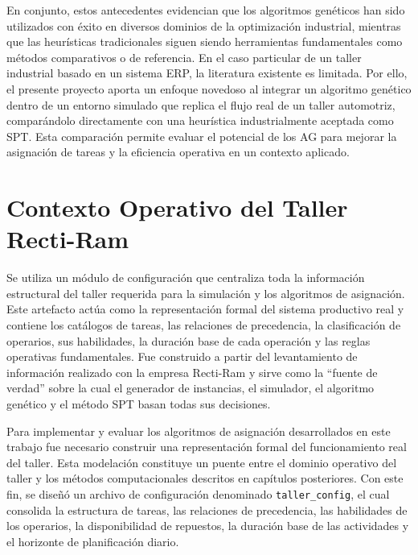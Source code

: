 En conjunto, estos antecedentes evidencian que los algoritmos genéticos han sido utilizados 
con éxito en diversos dominios de la optimización industrial, mientras que las heurísticas 
tradicionales siguen siendo herramientas fundamentales como métodos comparativos o de referencia. 
En el caso particular de un taller industrial basado en un sistema ERP, la literatura existente es 
limitada. Por ello, el presente proyecto aporta un enfoque novedoso al integrar un algoritmo genético 
dentro de un entorno simulado que replica el flujo real de un taller automotriz, 
comparándolo directamente con una heurística industrialmente aceptada como SPT. Esta comparación 
permite evaluar el potencial de los AG para mejorar la asignación de tareas y la eficiencia operativa 
en un contexto aplicado.

\section{Contexto Operativo del Taller Recti-Ram}

Se utiliza un módulo de configuración que centraliza toda la información estructural del taller 
requerida para la simulación y los algoritmos de asignación. Este artefacto actúa como la 
representación formal del sistema productivo real y contiene los catálogos de tareas, las 
relaciones de precedencia, la clasificación de operarios, sus habilidades, la duración base 
de cada operación y las reglas operativas fundamentales. Fue construido a partir del 
levantamiento de información realizado con la empresa Recti-Ram y sirve como la “fuente 
de verdad” sobre la cual el generador de instancias, el simulador, el algoritmo genético 
y el método SPT basan todas sus decisiones.

Para implementar y evaluar los algoritmos de asignación desarrollados en este trabajo 
fue necesario construir una representación formal del funcionamiento real del taller. 
Esta modelación constituye un puente entre el dominio operativo del taller y los métodos 
computacionales descritos en capítulos posteriores. Con este fin, se diseñó un archivo 
de configuración denominado \texttt{taller\_config}, el cual consolida la estructura de 
tareas, las relaciones de precedencia, las habilidades de los operarios, la disponibilidad 
de repuestos, la duración base de las actividades y el horizonte de planificación diario.

